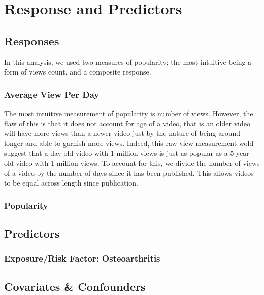 \section{Response and Predictors}
\subsection{Responses}
In this analysis, we used two measures of popularity; the most intuitive being a form of views count, and a composite response.
\subsubsection{Average View Per Day}
The most intuitive measurement of popularity is number of views. However, the flaw of this is that it does not account for age of a video, that is an older video will have more views than a newer video just by the nature of being around longer and able to garnish more views. Indeed, this raw view measurement wold suggest that a day old video with 1 million views is just as popular as a 5 year old video with 1 million views. To account for this, we divide the number of views of a video by the number of days since it has been published. This allows videos to be equal across length since publication.
\subsubsection{Popularity}


\subsection{Predictors}
\subsubsection{Exposure/Risk Factor: Osteoarthritis}


\subsection{Covariates \& Confounders}

